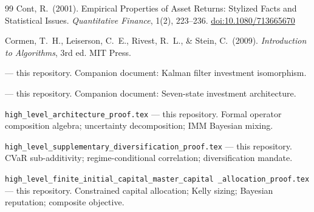 \documentclass[12pt,openany]{book}
\numberwithin{equation}{chapter}
\theoremstyle{plain}
\theoremstyle{definition}
\theoremstyle{remark}
\begin{document}
\begin{thebibliography}{99}
Cont, R.\ (2001).
Empirical Properties of Asset Returns: Stylized Facts and Statistical
Issues.
\textit{Quantitative Finance}, 1(2), 223--236.
\href{https://doi.org/10.1080/713665670}{doi:10.1080/713665670}

Cormen, T.\ H., Leiserson, C.\ E., Rivest, R.\ L., \& Stein, C.\ (2009).
\textit{Introduction to Algorithms}, 3rd ed.
MIT Press.

 --- this repository.
Companion document: Kalman filter investment isomorphism.

--- this repository.
Companion document: Seven-state investment architecture.

\texttt{high\_level\_architecture\_proof.tex} --- this repository.
Formal operator composition algebra; uncertainty decomposition;
IMM Bayesian mixing.

\texttt{high\_level\_supplementary\_diversification\_proof.tex} ---
this repository.
CVaR sub-additivity; regime-conditional correlation; diversification
mandate.

\texttt{high\_level\_finite\_initial\_capital\_master\_capital%
\_allocation\_proof.tex} --- this repository.
Constrained capital allocation; Kelly sizing; Bayesian reputation;
composite objective.

\end{thebibliography}
\end{document}
